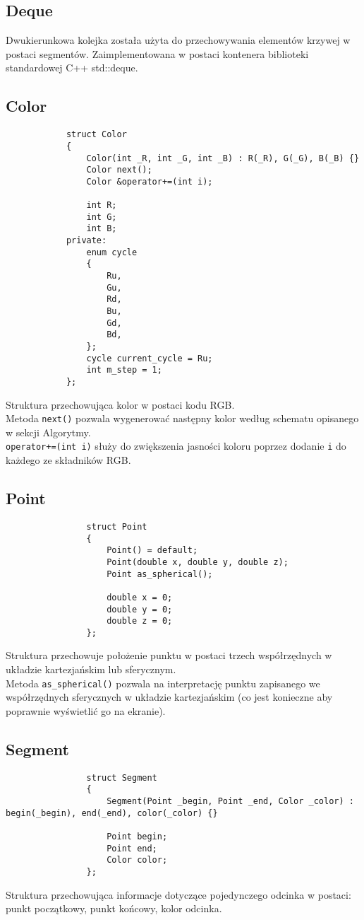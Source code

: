 		\subsection{Deque}
			Dwukierunkowa kolejka została użyta do przechowywania elementów krzywej w postaci segmentów.
			Zaimplementowana w postaci kontenera biblioteki standardowej C++ std::deque.
		\subsection{Color}
			\begin{lstlisting}
			struct Color
			{
			    Color(int _R, int _G, int _B) : R(_R), G(_G), B(_B) {}
			    Color next();
			    Color &operator+=(int i);
			
			    int R;
			    int G;
			    int B;
			private:
			    enum cycle
			    {
			        Ru,
			        Gu,
			        Rd,
			        Bu,
			        Gd,
			        Bd,
			    };
			    cycle current_cycle = Ru;
			    int m_step = 1;
			};
			\end{lstlisting}
			Struktura przechowująca kolor w postaci kodu RGB.\\
			Metoda \lstinline|next()| pozwala wygenerować następny kolor według schematu opisanego w sekcji Algorytmy.\\
			\lstinline|operator+=(int i)| służy do zwiększenia jasności koloru poprzez dodanie \lstinline|i| do każdego ze składników RGB.
		\subsection{Point}
			\begin{lstlisting}
				struct Point
				{
				    Point() = default;
				    Point(double x, double y, double z);
				    Point as_spherical();

				    double x = 0;
				    double y = 0;
				    double z = 0;
				};
			\end{lstlisting}
			Struktura przechowuje położenie punktu w postaci trzech współrzędnych w układzie kartezjańskim lub sferycznym.\\
			Metoda \lstinline|as_spherical()| pozwala na interpretację punktu zapisanego we współrzędnych sferycznych w układzie kartezjańskim (co jest konieczne aby poprawnie wyświetlić go na ekranie).
		\subsection{Segment}
			\begin{lstlisting}
				struct Segment
				{
				    Segment(Point _begin, Point _end, Color _color) : begin(_begin), end(_end), color(_color) {}
				
				    Point begin;
				    Point end;
				    Color color;
				};
			\end{lstlisting}
			Struktura przechowująca informacje dotyczące pojedynczego odcinka w postaci: punkt początkowy, punkt końcowy, kolor odcinka.
